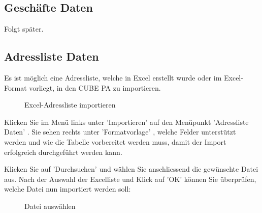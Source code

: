 \subsection{Geschäfte Daten}

Folgt später.

\subsection{Adressliste Daten}

Es ist möglich eine Adressliste, welche in Excel erstellt wurde oder im Excel-Format vorliegt, in den CUBE PA zu importieren. 

\begin{figure}[H]
\caption{Excel-Adressliste importieren}
\end{figure}

Klicken Sie im Menü links unter 'Importieren' auf den Menüpunkt 'Adressliste Daten' . Sie sehen rechts unter 'Formatvorlage' , welche Felder unterstützt werden und wie die Tabelle vorbereitet werden muss, damit der Import erfolgreich durchgeführt werden kann.

\vspace{\baselineskip}

Klicken Sie auf 'Durchsuchen'  und wählen Sie anschliessend die gewünschte Datei aus. Nach der Auswahl der Excelliste und Klick auf 'OK' können Sie überprüfen, welche Datei nun importiert werden soll:

\begin{figure}[H]
\caption{Datei auswählen}
\end{figure}

